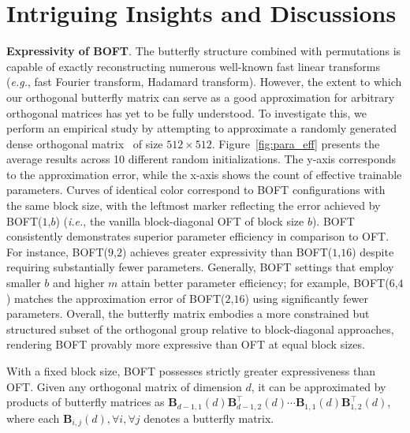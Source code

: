 \section{Intriguing Insights and Discussions}

\textbf{Expressivity of BOFT}. The butterfly structure combined with permutations is capable of exactly reconstructing numerous well-known fast linear transforms~\cite{dao2019learning,dao2019kaleidoscope} (\emph{e.g.}, fast Fourier transform, Hadamard transform). However, the extent to which our orthogonal butterfly matrix can serve as a good approximation for arbitrary orthogonal matrices has yet to be fully understood. To investigate this, we perform an empirical study by attempting to approximate a randomly generated dense orthogonal matrix~\cite{anderson1987generation} of size $512\times 512$. Figure~\ref{fig:para_eff} presents the average results across 10 different random initializations. The y-axis corresponds to the approximation error, while the x-axis shows the count of effective trainable parameters. Curves of identical color correspond to BOFT configurations with the same block size, with the leftmost marker reflecting the error achieved by BOFT($1$,$b$) (\emph{i.e.}, the vanilla block-diagonal OFT of block size $b$). BOFT consistently demonstrates superior parameter efficiency in comparison to OFT. For instance, BOFT($9$,$2$) achieves greater expressivity than BOFT($1$,$16$) despite requiring substantially fewer parameters. Generally, BOFT settings that employ smaller $b$ and higher $m$ attain better parameter efficiency; for example, BOFT($6$,$4$) matches the approximation error of BOFT($2$,$16$) using significantly fewer parameters. Overall, the butterfly matrix embodies a more constrained but structured subset of the orthogonal group relative to block-diagonal approaches, rendering BOFT provably more expressive than OFT at equal block sizes.

\begin{theorem}\label{thm:exp_boft}
    With a fixed block size, BOFT possesses strictly greater expressiveness than OFT. Given any orthogonal matrix of dimension $d$, it can be approximated by products of butterfly matrices as $\bm{B}_{d-1,1}(d)\bm{B}^\top_{d-1,2}(d)\cdots\bm{B}_{1,1}(d)\bm{B}^\top_{1,2}(d)$, where each $\bm{B}_{i,j}(d),\forall i,\forall j$ denotes a butterfly matrix.
\end{theorem}

